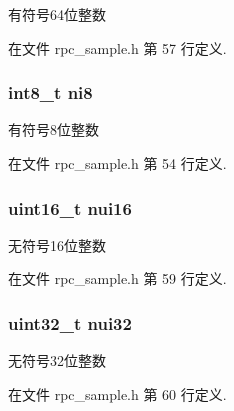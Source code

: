 有符号64位整数 



在文件 rpc\+\_\+sample.\+h 第 57 行定义.

\hypertarget{structrpc__sample_1_1my__object__t_aab8e35cb9f5f7c6e9e466d8d3698c05a}{}
\subsubsection[{ni8}]{\setlength{\rightskip}{0pt plus 5cm}int8\+\_\+t ni8}\label{structrpc__sample_1_1my__object__t_aab8e35cb9f5f7c6e9e466d8d3698c05a}


有符号8位整数 



在文件 rpc\+\_\+sample.\+h 第 54 行定义.

\hypertarget{structrpc__sample_1_1my__object__t_af4874e99994fc17939dbf1ac4ef00279}{}
\subsubsection[{nui16}]{\setlength{\rightskip}{0pt plus 5cm}uint16\+\_\+t nui16}\label{structrpc__sample_1_1my__object__t_af4874e99994fc17939dbf1ac4ef00279}


无符号16位整数 



在文件 rpc\+\_\+sample.\+h 第 59 行定义.

\hypertarget{structrpc__sample_1_1my__object__t_af28e05226ac75406862acdb1e630595a}{}
\subsubsection[{nui32}]{\setlength{\rightskip}{0pt plus 5cm}uint32\+\_\+t nui32}\label{structrpc__sample_1_1my__object__t_af28e05226ac75406862acdb1e630595a}


无符号32位整数 



在文件 rpc\+\_\+sample.\+h 第 60 行定义.


